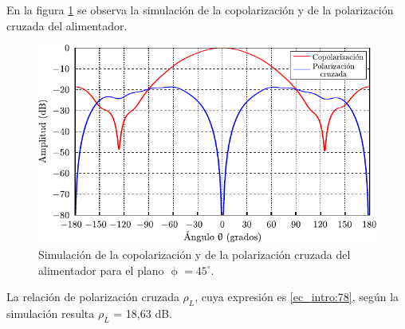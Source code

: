 En la figura \ref{fig_resultados:23} se observa la simulación de la copolarización y de la polarización cruzada del alimentador.
\begin{figure}[H]
\centering
\includegraphics[scale = 1]{Figures/Resultados/resultados_23}
\caption{Simulación de la copolarización y de la polarización cruzada del alimentador para el plano $\upphi = 45^{\circ}$.}
\label{fig_resultados:23}
\end{figure}
La relación de polarización cruzada $\rho_L$, cuya expresión es \eqref{ec_intro:78}, según la simulación resulta  $\rho_L$ = 18,63 dB.

